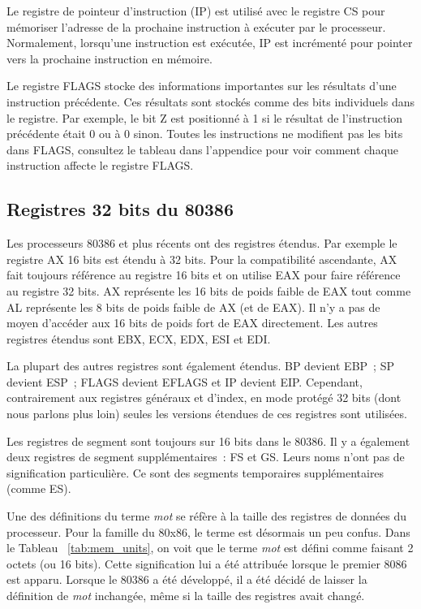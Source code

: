 Le registre de pointeur d'instruction (IP)  est utilisé avec le registre CS pour
mémoriser l'adresse de la prochaine instruction à exécuter par le processeur.
Normalement, lorsqu'une instruction est exécutée, IP est incrémenté pour pointer vers
la prochaine instruction en mémoire.

Le registre FLAGS  stocke des informations importantes sur les résultats
d'une instruction précédente. Ces résultats sont stockés comme des bits
individuels dans le registre. Par exemple, le bit Z est positionné à 1 si
le résultat de l'instruction précédente était 0 ou à 0 sinon. Toutes les
instructions ne modifient pas les bits dans FLAGS, consultez le tableau
dans l'appendice pour voir comment chaque instruction affecte le registre
FLAGS.

\subsection{Registres 32 bits du 80386}

Les processeurs 80386 et plus récents ont des registres étendus. Par exemple
le registre AX 16 bits est étendu à 32 bits. Pour la compatibilité ascendante,
AX fait toujours référence au registre 16 bits et on utilise EAX pour faire référence
au registre 32 bits. AX représente les 16 bits de poids faible de EAX tout comme AL
représente les 8 bits de poids faible de AX (et de EAX). Il n'y a pas de moyen
d'accéder aux 16 bits de poids fort de EAX directement. Les autres registres étendus sont
EBX, ECX, EDX, ESI et EDI.

La plupart des autres registres sont également étendus. BP devient EBP~;
SP devient ESP~; FLAGS devient EFLAGS et IP devient
EIP. Cependant, contrairement aux registres généraux et d'index, en mode protégé
32 bits (dont nous parlons plus loin) seules les versions étendues de ces registres sont utilisées.

Les registres de segment sont toujours sur 16 bits dans le 80386. Il y a également deux
registres de segment supplémentaires~: FS et GS. Leurs noms n'ont pas de signification
particulière. Ce sont des segments temporaires supplémentaires (comme ES).

Une des définitions du terme \emph{mot} se réfère à la taille des registres de données
du processeur. Pour la famille du 80x86, le terme est désormais un peu confus.
Dans le Tableau ~\ref{tab:mem_units}, on voit que le terme \emph{mot} est défini
comme faisant 2 octets (ou 16 bits). Cette signification lui a été attribuée
lorsque le premier 8086 est apparu. Lorsque le 80386 a été développé, il a été
décidé de laisser la définition de \emph{mot} inchangée, même si la taille des
registres avait changé.

